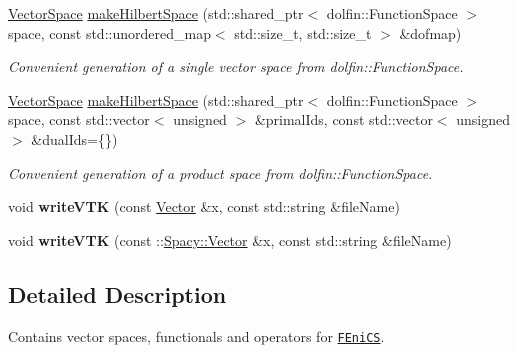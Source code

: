 \begin{DoxyCompactItemize}
\hyperlink{classSpacy_1_1VectorSpace}{\-Vector\-Space} \hyperlink{group__FenicsGroup_ga135620ce224178541cae896577f438dc}{make\-Hilbert\-Space} (std\-::shared\-\_\-ptr$<$ dolfin\-::\-Function\-Space $>$ space, const std\-::unordered\-\_\-map$<$ std\-::size\-\_\-t, std\-::size\-\_\-t $>$ \&dofmap)
\begin{DoxyCompactList}\small\item\em \-Convenient generation of a single vector space from dolfin\-::\-Function\-Space. \end{DoxyCompactList}\item 
\hyperlink{classSpacy_1_1VectorSpace}{\-Vector\-Space} \hyperlink{group__FenicsGroup_ga79df66c976cab487d2013de25c17bb39}{make\-Hilbert\-Space} (std\-::shared\-\_\-ptr$<$ dolfin\-::\-Function\-Space $>$ space, const std\-::vector$<$ unsigned $>$ \&primal\-Ids, const std\-::vector$<$ unsigned $>$ \&dual\-Ids=\{\})
\begin{DoxyCompactList}\small\item\em \-Convenient generation of a product space from dolfin\-::\-Function\-Space. \end{DoxyCompactList}\item 
\hypertarget{namespaceSpacy_1_1FEniCS_a9a327f617c26b4ea7b8d3fb68236cf6d}{void {\bfseries write\-V\-T\-K} (const \hyperlink{classSpacy_1_1FEniCS_1_1Vector}{\-Vector} \&x, const std\-::string \&file\-Name)}\label{namespaceSpacy_1_1FEniCS_a9a327f617c26b4ea7b8d3fb68236cf6d}

\item 
\hypertarget{namespaceSpacy_1_1FEniCS_a6e2e0e8c0892338ec1cda88d75824086}{void {\bfseries write\-V\-T\-K} (const \-::\hyperlink{classSpacy_1_1Vector}{\-Spacy\-::\-Vector} \&x, const std\-::string \&file\-Name)}\label{namespaceSpacy_1_1FEniCS_a6e2e0e8c0892338ec1cda88d75824086}

\end{DoxyCompactItemize}


\subsection{\-Detailed \-Description}
\-Contains vector spaces, functionals and operators for \href{www.fenicsproject.org}{\tt \-F\-Eni\-C\-S}. 

